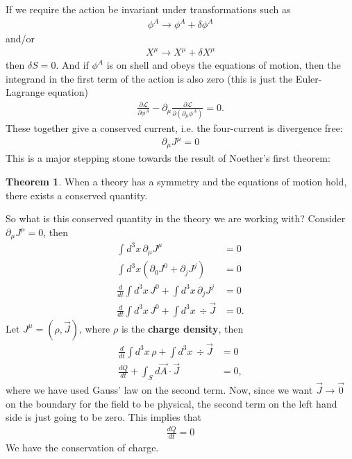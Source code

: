 \documentclass[a4paper,11pt]{article}
\numberwithin{equation}{section}
\theoremstyle{definition}
\newtheorem{thm}{Theorem}[section]
\newcommand{\p}{\partial}
\newcommand{\lag}{\mathcal{L}}
\newcommand{\nn}{\nonumber}
\begin{document}
If we require the action be invariant under transformations such as
\begin{align}
\phi^A \to \phi^A + \delta \phi^A
\end{align}
and/or 
\begin{align}
X^\mu \to X^\mu + \delta X^\mu
\end{align}
then $\delta S = 0$. And if $\phi^A$ is on shell and obeys the equations of motion, then the integrand in the first term of the action is also zero (this is just the Euler-Lagrange equation)
\begin{align}
\frac{\p \lag}{\p \phi^A} - \p_\mu\frac{\p \lag}{\p( \p_\mu\phi^A)} = 0.
\end{align}
These together give a conserved current, i.e. the four-current is divergence free:
\begin{align}
\boxed{\p_\mu J^\mu = 0}
\end{align}
This is a major stepping stone towards the result of Noether's first theorem:

\begin{thm}
	When a theory has a symmetry and the equations of motion hold, there exists a conserved quantity. 
\end{thm}

So what is this conserved quantity in the theory we are working with? Consider $\p_\mu J^\mu = 0$, then
\begin{align}
\int d^3x \, \p_\mu J^\mu &= 0\nn\\
\int d^3x \left(\p_0 J^0 + \p_j J^j\right) &= 0\nn\\
\frac{d}{dt}\int d^3x\, J^0 + \int d^3x\, \p_j J^j &= 0\nn\\
\frac{d}{dt}\int d^3x\, J^0 + \int d^3x\, \div{\vec{J}} &= 0.
\end{align}
Let $J^\mu = (\rho,\vec{J})$, where $\rho$ is the \textbf{charge density}, then
\begin{align}
\frac{d}{dt}\int d^3x\, \rho + \int d^3x\, \div{\vec{J}} &= 0\nn\\
\frac{dQ}{dt} + \int_S d\vec{A}\cdot \vec{J} &= 0,
\end{align}
where we have used Gauss' law on the second term. Now, since we want $\vec{J} \to \vec{0}$ on the boundary for the field to be physical, the second term on the left hand side is just going to be zero. This implies that
\begin{align}
\boxed{\frac{dQ}{dt} = 0}
\end{align}
We have the conservation of charge. \\
\end{document}
